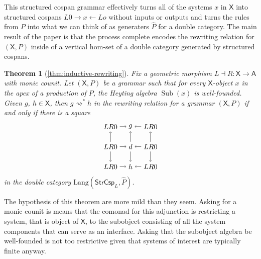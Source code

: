\documentclass{amsart}
\renewcommand{\hat}[1]{\widehat{#1}}
\newcommand{\A}{\cat{A}}
\newcommand{\X}{\cat{X}}
\newcommand{\StrCsp}{\cat{StrCsp}}
\newcommand{\Lang}{\mathrm{Lang}}
\newcommand{\cat}[1]{\mathsf{#1}}
\newcommand{\from}{\colon}
\newcommand{\deriv}[2]{#1 \rightsquigarrow^\ast #2}
\renewcommand{\gets}{\leftarrow}
\DeclareMathOperator{\Sub}{Sub}
\newtheorem*{theorem*}{Theorem}
\theoremstyle{remark}
\theoremstyle{definition}
\begin{document}
This structured cospan grammar effectively turns all of the systems $ x $
in $ \X $ into structured cospans $ L0 \to x \gets Lo $ without inputs
or outputs and turns the rules from $ P $ into what we can think of as
generaters $ \hat{P} $ for a double category.  The main result of the
paper is that the process complete encodes the rewriting relation for
$ ( \X,P ) $ inside of a vertical hom-set of a double category
generated by structured cospans.

\begin{theorem*}[\ref{thm:inductive-rewriting}]
  Fix a geometric morphism $ L \dashv R \from \X \to \A $ with monic
  counit. Let $ ( \X , P ) $ be a grammar such that for every
  $ \X $-object $ x $ in the apex of a production of $ P $, the
  Heyting algebra $ \Sub (x) $ is well-founded. Given $ g $,
  $ h \in \X $, then $ \deriv{g}{h} $ in the rewriting relation for a
  grammar $ ( \X , P ) $ if and only if there is a square
  \[
    \begin{tikzpicture}
      \node (1t) at (0,2) {$ LR 0 $};
      \node (2t) at (1,2) {$ g $};
      \node (3t) at (2,2) {$ LR 0 $};
      \node (1m) at (0,1) {$ LR 0 $};
      \node (2m) at (1,1) {$ d $};
      \node (3m) at (2,1) {$ LR 0 $};
      \node (1b) at (0,0) {$ LR 0 $};
      \node (2b) at (1,0) {$ h $};
      \node (3b) at (2,0) {$ LR 0 $};
      \draw [->] (1t) to node [] {\scriptsize{$  $}} (2t);
      \draw [->] (3t) to node [] {\scriptsize{$  $}} (2t);
      \draw [->] (1m) to node [] {\scriptsize{$  $}} (2m);
      \draw [->] (3m) to node [] {\scriptsize{$  $}} (2m);
      \draw [->] (1b) to node [] {\scriptsize{$  $}} (2b);
      \draw [->] (3b) to node [] {\scriptsize{$  $}} (2b);
      \draw [->] (1m) to node [] {\scriptsize{$  $}} (1t);
      \draw [->] (1m) to node [] {\scriptsize{$  $}} (1b);
      \draw [->] (2m) to node [] {\scriptsize{$  $}} (2t);
      \draw [->] (2m) to node [] {\scriptsize{$  $}} (2b);
      \draw [->] (3m) to node [] {\scriptsize{$  $}} (3t);
      \draw [->] (3m) to node [] {\scriptsize{$  $}} (3b);
    \end{tikzpicture}
  \]
  in the double category $ \Lang ( \StrCsp_L , \hat{P} ) $.
\end{theorem*}

The hypothesis of this theorem are more mild than they seem.  Asking
for a monic counit is means that the comonad for this adjunction is
restricting a system, that is object of $ \X $, to the subobject
consisting of all the system components that can serve as an
interface.  Asking that the subobject algebra be well-founded is not
too restrictive given that systems of interest are typically finite
anyway.
\end{document}
